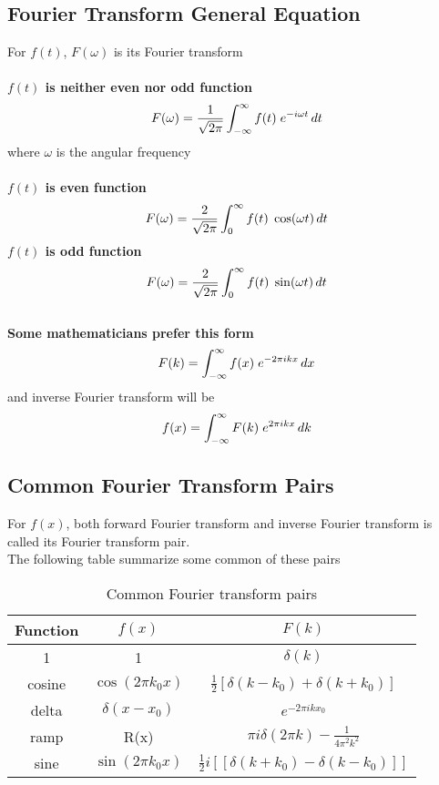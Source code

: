 \documentclass[12pt, a4paper]{article}
\numberwithin{equation}{section}
\begin{document}
	\subsection{Fourier Transform General Equation}
	For $f(t)$, $F(\omega)$ is its Fourier transform\\\\
	\textbf{$f(t)$ is neither even nor odd function}
	\begin{equation}
		F(\omega) = \frac{1}{\sqrt{2\pi}}\int_{-\infty}^{\infty}f(t)\hspace{0.1cm}e^{-i\omega t}\,dt
	\end{equation}
	where $\omega$ is the angular frequency\\\\
	\textbf{$f(t)$ is even function}
	\begin{equation}
		F(\omega) = \frac{2}{\sqrt{2\pi}}\int_{0}^{\infty}f(t)\hspace{0.1cm}\cos(\omega t)\,dt
	\end{equation}
	\textbf{$f(t)$ is odd function}
	\begin{equation}
		F(\omega) = \frac{2}{\sqrt{2\pi}}\int_{0}^{\infty}f(t)\hspace{0.1cm}\sin(\omega t)\,dt
	\end{equation}\\
	\textbf{Some mathematicians prefer this form}
	\begin{equation}
		F(k) = \int_{-\infty}^{\infty}f(x)\hspace{0.1cm}e^{-2\pi i k x}\,dx
	\end{equation}
	and inverse Fourier transform will be
	\begin{equation}
		f(x) = \int_{-\infty}^{\infty}F(k)\hspace{0.1cm}e^{2\pi i k x}\,dk
	\end{equation}
	\pagebreak
	\subsection{Common Fourier Transform Pairs}
	For $f(x)$, both forward Fourier transform and inverse Fourier transform is called its Fourier transform pair.\\
	
	The following table summarize some common of these pairs
	\begin{table}[h!]
		\centering
		\begin{tabular}{|c|c|c|}\hline
			\textbf{Function} & $f(x)$ & $F(k)$\\ \hline
			1 & 1 & $\delta(k)$\\ \hline
			cosine & $\cos(2\pi k_0 x)$ & $\frac{1}{2}[\delta(k - k_0) + \delta(k + k_0)]$\\ \hline
			delta & $\delta(x - x_0)$ & $e^{-2\pi i k x_0}$\\ \hline
			ramp & R(x) & $\pi i \delta(2\pi k) - \frac{1}{4\pi^2 k^2}$\\ \hline
			sine & $\sin(2\pi k_0 x)$ & $\frac{1}{2} i [[\delta(k + k_0) - \delta(k - k_0)]]$\\ \hline
		\end{tabular}
		\caption{Common Fourier transform pairs}
		\label{table_fourier_trans_pairs}
	\end{table}
	
\end{document}
